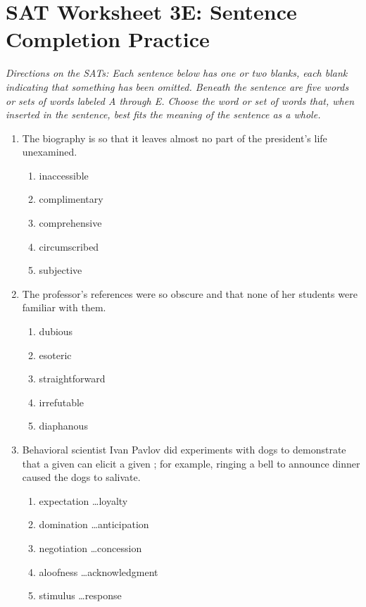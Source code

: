 \vfill
\newpage

\section[Practice]{SAT Worksheet 3E: Sentence Completion Practice}
\textit{Directions on the SATs: Each sentence below has one or two blanks, each blank indicating that something has been omitted.  Beneath the sentence are five words or sets of words labeled A through E.  Choose the word or set of words that, when inserted in the sentence, best fits the meaning of the sentence as a whole.}

\begin{enumerate}
\item The biography is so \longline that it leaves almost no part of the president's life unexamined.
\begin{enumerate}[label=(\Alph*)]
\item inaccessible
\item complimentary
\item comprehensive
\item circumscribed
\item subjective
\end{enumerate}

\bigskip
\item The professor's references were so obscure and \longline that none of her students were familiar with them.
\begin{enumerate}[label=(\Alph*)]
\item dubious
\item esoteric
\item straightforward
\item irrefutable
\item diaphanous
\end{enumerate}

\bigskip
\item Behavioral scientist Ivan Pavlov did experiments with dogs to demonstrate that a given \longline can elicit a given \longline; for example, ringing a bell to announce dinner caused the dogs to salivate.
\begin{enumerate}[label=(\Alph*)]
\item expectation \ldots loyalty
\item domination \ldots anticipation
\item negotiation \ldots concession
\item aloofness \ldots acknowledgment
\item stimulus \ldots response 
\end{enumerate}


\end{enumerate}

